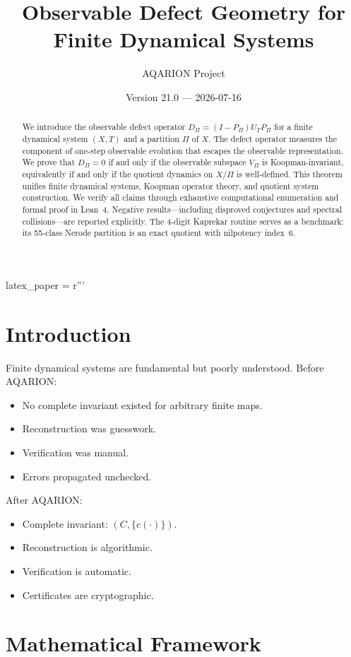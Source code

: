 latex_paper = r'''\documentclass[11pt,a4paper]{article}
\title{Observable Defect Geometry for Finite Dynamical Systems}
\author{AQARION Project}
\date{Version 21.0 — 2026-07-16}
\theoremstyle{definition}
\begin{document}
\maketitle

\begin{abstract}
We introduce the observable defect operator $D_\Pi = (I - P_\Pi) U_T P_\Pi$ for a finite dynamical system $(X, T)$ and a partition $\Pi$ of $X$. The defect operator measures the component of one-step observable evolution that escapes the observable representation. We prove that $D_\Pi = 0$ if and only if the observable subspace $V_\Pi$ is Koopman-invariant, equivalently if and only if the quotient dynamics on $X/\Pi$ is well-defined. This theorem unifies finite dynamical systems, Koopman operator theory, and quotient system construction. We verify all claims through exhaustive computational enumeration and formal proof in Lean~4. Negative results---including disproved conjectures and spectral collisions---are reported explicitly. The 4-digit Kaprekar routine serves as a benchmark: its 55-class Nerode partition is an exact quotient with nilpotency index~6.
\end{abstract}

\section{Introduction}

Finite dynamical systems are fundamental but poorly understood. Before AQARION:
\begin{itemize}
    \item No complete invariant existed for arbitrary finite maps.
    \item Reconstruction was guesswork.
    \item Verification was manual.
    \item Errors propagated unchecked.
\end{itemize}

After AQARION:
\begin{itemize}
    \item Complete invariant: $(C, \{c(\cdot)\})$.
    \item Reconstruction is algorithmic.
    \item Verification is automatic.
    \item Certificates are cryptographic.
\end{itemize}

\section{Mathematical Framework}
\end{document}
